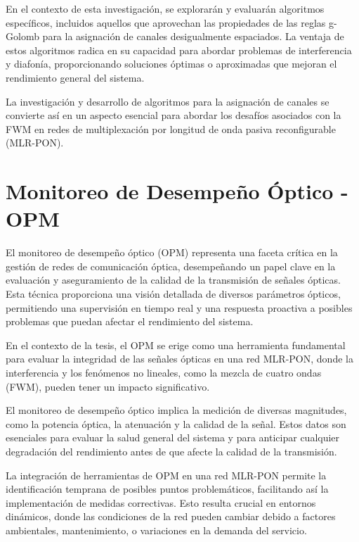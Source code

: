 En el contexto de esta investigación, se explorarán y evaluarán algoritmos específicos, incluidos aquellos que aprovechan las propiedades de las reglas g-Golomb para la asignación de canales desigualmente espaciados. La ventaja de estos algoritmos radica en su capacidad para abordar problemas de interferencia y diafonía, proporcionando soluciones óptimas o aproximadas que mejoran el rendimiento general del sistema.

La investigación y desarrollo de algoritmos para la asignación de canales se convierte así en un aspecto esencial para abordar los desafíos asociados con la FWM en redes de multiplexación por longitud de onda pasiva reconfigurable (MLR-PON).

\section{Monitoreo de Desempeño Óptico - OPM}

El monitoreo de desempeño óptico (OPM) representa una faceta crítica en la gestión de redes de comunicación óptica, desempeñando un papel clave en la evaluación y aseguramiento de la calidad de la transmisión de señales ópticas. Esta técnica proporciona una visión detallada de diversos parámetros ópticos, permitiendo una supervisión en tiempo real y una respuesta proactiva a posibles problemas que puedan afectar el rendimiento del sistema.

En el contexto de la tesis, el OPM se erige como una herramienta fundamental para evaluar la integridad de las señales ópticas en una red MLR-PON, donde la interferencia y los fenómenos no lineales, como la mezcla de cuatro ondas (FWM), pueden tener un impacto significativo.

El monitoreo de desempeño óptico implica la medición de diversas magnitudes, como la potencia óptica, la atenuación y la calidad de la señal. Estos datos son esenciales para evaluar la salud general del sistema y para anticipar cualquier degradación del rendimiento antes de que afecte la calidad de la transmisión.

La integración de herramientas de OPM en una red MLR-PON permite la identificación temprana de posibles puntos problemáticos, facilitando así la implementación de medidas correctivas. Esto resulta crucial en entornos dinámicos, donde las condiciones de la red pueden cambiar debido a factores ambientales, mantenimiento, o variaciones en la demanda del servicio.
